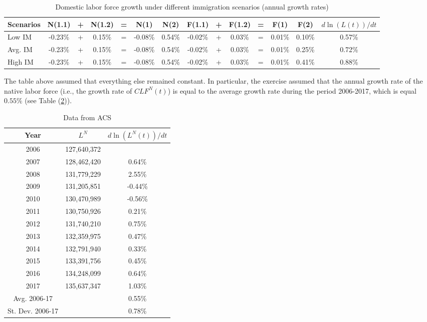 \documentclass[
    abstract=true,
    11pt,
    letterpaper,
    oneside,
    headinclude,
    footinclude,
    BCOR=5mm,
]{scrartcl}
\begin{document}
\begin{table}[H] 
\small
\centering
\begin{tabular}{l||ccccc|c||ccccc|c||c} \hline
Scenarios  & N(1.1) &+& N(1.2) &=& N(1)    & N(2)   & F(1.1) & + & F(1.2) &=& F(1)   & F(2)   & $d \ln(L(t))/dt$\\ \hline
Low IM     & -0.23\% &+& 0.15\% &=& -0.08\% & 0.54\% & -0.02\% &+& 0.03\% &=& 0.01\% & 0.10\% & 0.57\% \\
Avg. IM & -0.23\% &+& 0.15\% &=& -0.08\% & 0.54\% & -0.02\% &+& 0.03\% &=& 0.01\% & 0.25\% & 0.72\% \\
High IM    & -0.23\% &+& 0.15\% &=& -0.08\% & 0.54\% & -0.02\% &+& 0.03\% &=& 0.01\% & 0.41\% & 0.88\% \\ \hline
\end{tabular}
\caption{Domestic labor force growth under different immigration scenarios (annual growth rates)} \label{tab:Im_Scenarios}
\end{table}

The table above assumed that everything else remained constant. In particular, the exercise assumed that the annual growth rate of the native labor force (i.e., the growth rate of $CLF^N(t)$) is equal to the average growth rate during the period 2006-2017, which is equal $0.55\%$ (see Table (\ref{tab:LNagr})).

\begin{table}[H] 
\centering 
\begin{tabular}{c|cc} \hline
Year          & $L^N$       & $d\ln(L^N(t))/dt$ \\ \hline
2006          & 127,640,372 &                   \\
2007          & 128,462,420 & 0.64\%            \\
2008          & 131,779,229 & 2.55\%            \\
2009          & 131,205,851 & -0.44\%           \\
2010          & 130,470,989 & -0.56\%           \\
2011          & 130,750,926 & 0.21\%            \\
2012          & 131,740,210 & 0.75\%            \\
2013          & 132,359,975 & 0.47\%            \\
2014          & 132,791,940 & 0.33\%            \\
2015          & 133,391,756 & 0.45\%            \\
2016          & 134,248,099 & 0.64\%            \\
2017          & 135,637,347 & 1.03\%            \\ \hline
Avg. 2006-17 &             & 0.55\%            \\
St. Dev. 2006-17  &             & 0.78\% \\ \hline
\end{tabular}
\caption{Data from ACS} \label{tab:LNagr}
\end{table}
\end{document}
